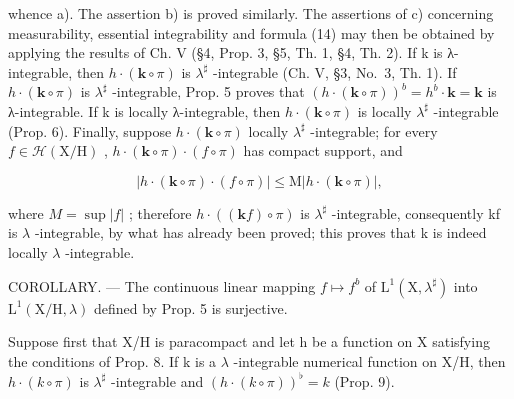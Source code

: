 whence a). The assertion b) is proved similarly. The assertions of c) concerning measurability, essential integrability and formula (14) may then be obtained by applying the results of Ch. V (§4, Prop. 3, §5, Th. 1, §4, Th. 2). If k is λ-integrable, then \(h \cdot (\mathbf{k} \circ \pi)\) is \(\lambda^{\sharp}\) -integrable (Ch. V, §3, No.~3, Th. 1). If \(h \cdot (\mathbf{k} \circ \pi)\) is \(\lambda^{\sharp}\) -integrable, Prop. 5 proves that \((h \cdot (\mathbf{k} \circ \pi))^b = h^b \cdot \mathbf{k} = \mathbf{k}\) is λ-integrable. If k is locally λ-integrable, then \(h \cdot (\mathbf{k} \circ \pi)\) is locally \(\lambda^{\sharp}\) -integrable (Prop. 6). Finally, suppose \(h \cdot (\mathbf{k} \circ \pi)\) locally \(\lambda^{\sharp}\) -integrable; for every \(f \in \mathcal{H}(\mathrm{X}/\mathrm{H})\) , \(h \cdot (\mathbf{k} \circ \pi) \cdot (f \circ \pi)\) has compact support, and

\[
\left| h \cdot (\mathbf {k} \circ \pi) \cdot (f \circ \pi) \right| \leqslant \mathrm{M} \left| h \cdot (\mathbf {k} \circ \pi) \right|,
\]

where \(M = \sup |f|\) ; therefore \(h \cdot ((\mathbf{k}f) \circ \pi)\) is \(\lambda^{\sharp}\) -integrable, consequently kf is \(\lambda\) -integrable, by what has already been proved; this proves that k is indeed locally \(\lambda\) -integrable.

COROLLARY. --- The continuous linear mapping \(f \mapsto f^{b}\) of \(\mathrm{L}^{1}(\mathrm{X}, \lambda^{\sharp})\) into \(\mathrm{L}^{1}(\mathrm{X}/\mathrm{H}, \lambda)\) defined by Prop. 5 is surjective.

Suppose first that X/H is paracompact and let h be a function on X satisfying the conditions of Prop. 8. If k is a \(\lambda\) -integrable numerical function on X/H, then \(h \cdot (k \circ \pi)\) is \(\lambda^{\sharp}\) -integrable and \((h \cdot (k \circ \pi))^{\flat} = k\) (Prop. 9).

